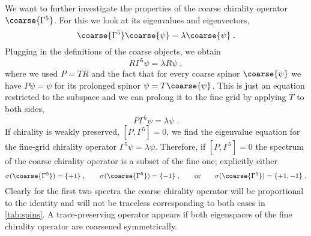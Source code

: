 We want to further investigate the properties of the coarse chirality operator $\coarse{\Gamma^{5}}$.
For this we look at its eigenvalues and eigenvectors,
\begin{equation}
\coarse{\Gamma^{5}} \coarse{\psi} = \lambda \coarse{\psi} \;.
\end{equation}
Plugging in the definitions of the coarse objects, we obtain
\begin{equation}
R \Gamma^{5} \psi = \lambda R \psi \;,
\end{equation}
where we used $P = TR$ and the fact that for every coarse spinor $\coarse{\psi}$ we have $P \psi = \psi$ for its prolonged spinor $\psi = T \coarse{\psi}$.
This is just an equation restricted to the subspace and we can prolong it to the fine grid by applying $T$ to both sides,
\begin{equation}
P \Gamma^{5} \psi = \lambda \psi \;.
\end{equation}
If chirality is weakly preserved, $[P, \Gamma^{5}] = 0$, we find the eigenvalue equation for the fine-grid chirality operator $\Gamma^{5} \psi = \lambda \psi$.
Therefore, if $[P, \Gamma^{5}] = 0$ the spectrum of the coarse chirality operator is a subset of the fine one; explicitly either
\begin{equation} \label{eq:sigma}
\sigma(\coarse{\Gamma^{5}}) = \{+1\} \;,
\qquad
\sigma(\coarse{\Gamma^{5}}) = \{-1\} \;,
\qquad
\text{or}
\qquad
\sigma(\coarse{\Gamma^{5}}) = \{+1, -1\} \;.
\end{equation}
Clearly for the first two spectra the coarse chirality operator will be proportional to the identity and will not be traceless corresponding to both cases  in \cref{tab:spins}.
A trace-preserving operator appears if both eigenspaces of the fine chirality operator are coarsened symmetrically.


